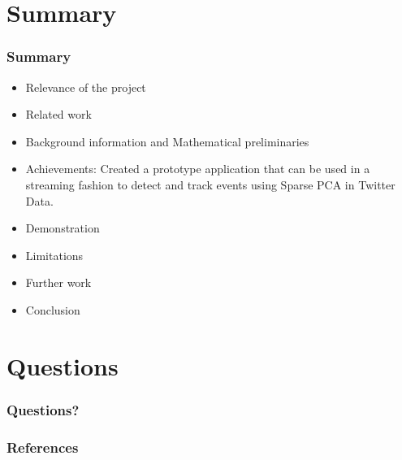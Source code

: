 \documentclass{beamer}
\begin{document}
\section{Summary}
\begin{frame}
\frametitle{Summary}
\begin{itemize}
\item Relevance of the project
\item Related work
\item Background information and Mathematical preliminaries
\item Achievements: Created a prototype application that can be used in a streaming fashion to detect and track events using Sparse PCA in Twitter Data.
\item Demonstration
\item Limitations
\item Further work
\item Conclusion 
\end{itemize}

\end{frame}

\section{Questions}
\begin{frame}
\frametitle{Questions?}

\end{frame}
\begin{frame}
\frametitle{References}


\end{frame}
\end{document}
